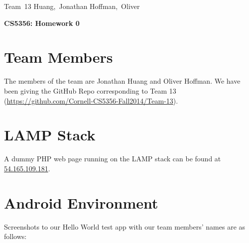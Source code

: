 \documentclass[11pt]{article}
\begin{document}
\hfill\vbox{\hbox{Team 13}
      \hbox{Huang, Jonathan}
      \hbox{Hoffman, Oliver}}\par

\bigskip
\centerline{\Large\bf CS5356: Homework 0}\par
\bigskip

\section{Team Members}
The members of the team are Jonathan Huang and Oliver Hoffman. We have been giving the GitHub Repo corresponding to Team 13 (\url{https://github.com/Cornell-CS5356-Fall2014/Team-13}).

\section{LAMP Stack}
A dummy PHP web page running on the LAMP stack can be found at \url{54.165.109.181}.

\section{Android Environment}
Screenshots to our Hello World test app with our team members' names are as follows:
\end{document}
